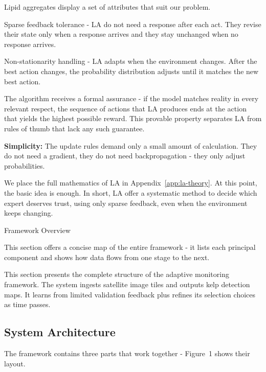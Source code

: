 \documentclass[11pt,a4paper]{article}
\begin{document}
Lipid aggregates display a set of attributes that suit our problem.

Sparse feedback tolerance - LA do not need a response after each act. They revise their state only when a response arrives and they stay unchanged when no response arrives.

Non-stationarity handling - LA adapts when the environment changes. After the best action changes, the probability distribution adjusts until it matches the new best action.

The algorithm receives a formal assurance - if the model matches reality in every relevant respect, the sequence of actions that LA produces ends at the action that yields the highest possible reward. This provable property separates LA from rules of thumb that lack any such guarantee.

\item \textbf{Simplicity:} The update rules demand only a small amount of calculation. They do not need a gradient, they do not need backpropagation - they only adjust probabilities.

We place the full mathematics of LA in Appendix~\ref{app:la-theory}. At this point, the basic idea is enough. In short, LA offer a systematic method to decide which expert deserves trust, using only sparse feedback, even when the environment keeps changing.


Framework Overview

This section offers a concise map of the entire framework - it lists each principal component and shows how data flows from one stage to the next.

This section presents the complete structure of the adaptive monitoring framework. The system ingests satellite image tiles and outputs kelp detection maps. It learns from limited validation feedback plus refines its selection choices as time passes.

\subsection{System Architecture}

The framework contains three parts that work together - Figure~1 shows their layout.
\end{document}
